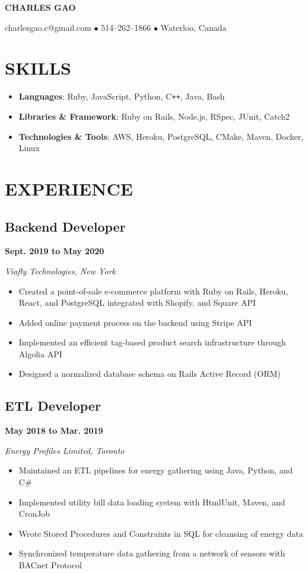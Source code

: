 \documentclass[12pt]{extarticle}
\begin{document}
\begin{center}
\textbf{\huge{{\color{DarkBlue}CHARLES} \color{DarkGrey}GAO}}

charlesgao.c@gmail.com $\bullet$ 514--262--1866 $\bullet$ Waterloo, Canada
\end{center}

\section*{SKILLS}
\begin{itemize}
  \item \textbf{Languages}: Ruby, JavaScript, Python, C\texttt{++}, Java, Bash
  \item \textbf{Libraries \& Framework}: Ruby on Rails, Node.js, RSpec, JUnit, Catch2
  \item \textbf{Technologies \& Tools}: AWS, Heroku, PostgreSQL, CMake, Maven, Docker, Linux
\end{itemize}

\section*{EXPERIENCE}
\subsection*{Backend Developer} \hfill \textbf{Sept. 2019 to May 2020}

\textit{Viafly Technologies, New York}
\begin{itemize}
  \item Created a point-of-sale e-commerce platform with Ruby on Rails, Heroku, React, and PostgreSQL integrated with Shopify, and Square API
  \item Added online payment process on the backend using Stripe API
  \item Implemented an efficient tag-based product search infrastructure through Algolia API
  \item Designed a normalized database schema on Rails Active Record (ORM)
\end{itemize}

\subsection*{ETL Developer} \hfill \textbf{May 2018 to Mar. 2019}

\textsl{Energy Profiles Limited, Toronto}
\begin{itemize}
  \item Maintained an ETL pipelines for energy gathering using Java, Python, and C\#
  \item Implemented utility bill data loading system with HtmlUnit, Maven, and CronJob
  \item Wrote Stored Procedures and Constraints in SQL for cleansing of energy data
  \item Synchronized temperature data gathering from a network of sensors with BACnet Protocol
\end{itemize}
\end{document}
